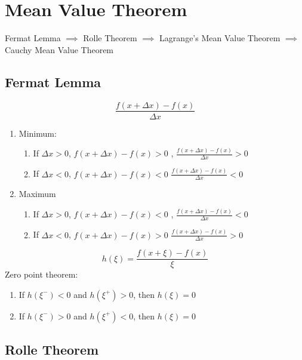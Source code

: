 

\section{Mean Value Theorem}%
Fermat Lemma
\( \implies \)
Rolle Theorem
\( \implies \)
Lagrange's Mean Value Theorem
\( \implies \)
Cauchy Mean Value Theorem

\subsection{Fermat Lemma}%
\label{sub:Fermat_Lemma}

\begin{equation*}
\frac{f(x + \Delta x) - f(x)}{\Delta x}
\end{equation*}

\begin{enumerate}
	\item Minimum: 
	\begin{enumerate}
		\item If \( \Delta x > 0 \), \( f(x + \Delta x) - f(x) > 0\) , 
\( \frac{f(x + \Delta x) - f(x)}{\Delta x} >0 \)
		\item If \( \Delta x < 0 \), \( f(x + \Delta x) - f(x) < 0\) 
\( \frac{f(x + \Delta x) - f(x)}{\Delta x} <0 \)
	\end{enumerate}
	\item Maximum 
\begin{enumerate}
		\item If \( \Delta x > 0 \), \( f(x + \Delta x) - f(x) < 0\) , 
\( \frac{f(x + \Delta x) - f(x)}{\Delta x} <0 \)
		\item If \( \Delta x < 0 \), \( f(x + \Delta x) - f(x) > 0\) 
\( \frac{f(x + \Delta x) - f(x)}{\Delta x} >0 \)
	\end{enumerate}
\end{enumerate}
\begin{equation*}
	h(\xi) = \frac{f(x + \xi) - f(x)}{\xi}
\end{equation*}
Zero point theorem:
\begin{enumerate}
	\item If \( h(\xi^-) < 0 \) and \( h(\xi^+) > 0 \), then \( h(\xi) = 0 \)
	\item If \( h(\xi^-) > 0 \) and \( h(\xi^+) < 0 \), then \( h(\xi) = 0 \)
\end{enumerate}

\subsection{Rolle Theorem}%
\label{sub:Rolle_Theorem}

